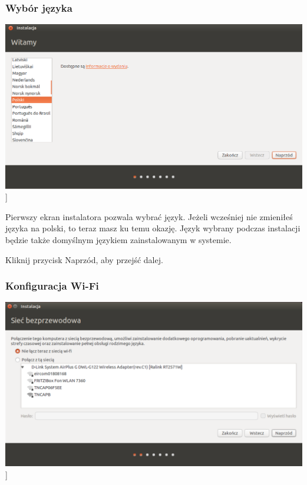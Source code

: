 \subsubsection{Wybór języka}
\begin{center}
        \includegraphics[width=\linewidth]{images/instalator_jezyk.png}]
\end{center}

Pierwszy ekran instalatora pozwala wybrać język. Jeżeli wcześniej nie zmieniłeś języka na polski, to teraz masz ku temu okazję. Język wybrany podczas instalacji będzie także domyślnym językiem zainstalowanym w systemie.
\begin{flushright}
Kliknij przycisk \textcolor{ubuntu_orange}{Naprzód}, aby przejść dalej.
\end{flushright}
\clearpage
\subsubsection{Konfiguracja Wi-Fi}
\begin{center}
        \includegraphics[width=\linewidth]{images/instalator_wifi.png}]
\end{center}

